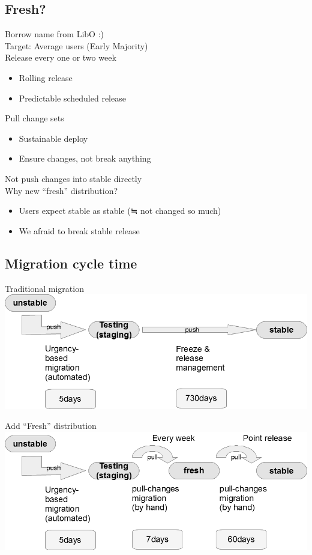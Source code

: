 \documentclass[mingoth,a4paper]{jsarticle}
\begin{document}
\subsection{Fresh?}
\noindent
Borrow name from LibO :)
\\
Target: Average users (Early Majority)
\\
Release every one or two week
\begin{itemize}
 \item Rolling release
 \item Predictable scheduled release
\end{itemize}
Pull change sets
\begin{itemize}
 \item Sustainable deploy
 \item Ensure changes, not break anything
\end{itemize}
Not push changes into stable directly
\\
Why new “fresh” distribution?
\begin{itemize}
 \item Users expect stable as stable (≒ not changed so much)
 \item We afraid to break stable release
\end{itemize}
\subsection{Migration cycle time}
\noindent
Traditional migration
\\
\includegraphics[width=\linewidth]{image201711-tokyo/Rethinking-debian-release-p16_gray.png}

\noindent
Add “Fresh” distribution\\
\includegraphics[width=\linewidth]{image201711-tokyo/Rethinking-debian-release-p17_gray.png}
\end{document}
